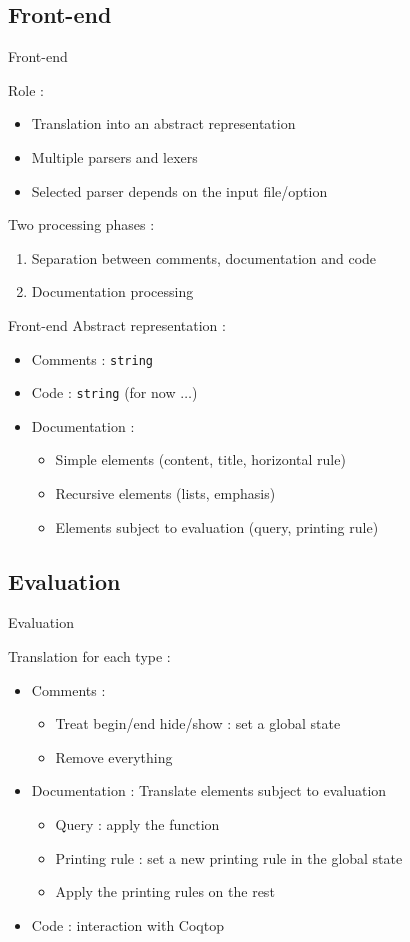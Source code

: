\documentclass[compress]{beamer}
\newenvironment{tframe}[1]{
  \subsection{#1}
  \begin{frame}{#1}
  }{
  \end{frame}
  }
\begin{document}
  \begin{tframe}{Front-end}
    Role :
    \begin{itemize}
      \item Translation into an abstract representation
      \item Multiple parsers and lexers
      \item Selected parser depends on the input file/option
    \end{itemize}

    \vfill
    Two processing phases :
    \begin{enumerate}
      \item Separation between comments, documentation and code
      \item Documentation processing
    \end{enumerate}
  \end{tframe}
  \begin{frame}{Front-end}
      Abstract representation  :
      \begin{itemize}
        \item Comments : \texttt{string}
        \item Code : \texttt{string} (for now $\ldots$)
        \item Documentation : \\
          \begin{itemize}
            \item Simple elements (content, title, horizontal rule)
            \item Recursive elements (lists, emphasis)
            \item Elements subject to evaluation (query, printing rule)
          \end{itemize}
      \end{itemize}
    \end{frame}

  \begin{tframe}{Evaluation}
    Translation for each type :
    \begin{itemize}
      \item Comments : \\
         \begin{itemize}
           \item Treat begin/end hide/show : set a global state
           \item Remove everything
        \end{itemize}
      \item Documentation : Translate elements subject to evaluation \\
        \begin{itemize}
          \item Query : apply the function
          \item Printing rule : set a new printing rule in the global state
          \item Apply the printing rules on the rest
        \end{itemize}
      \item Code : interaction with Coqtop
    \end{itemize}
  \end{tframe}
\end{document}
